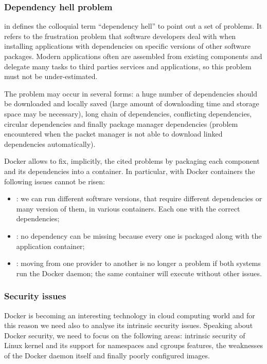 \subsubsection{Dependency hell problem}
\label{sec:background-deployments-docker-dependencyHell}
\citeauthor{michaeljang2006} in \cite{michaeljang2006} defines the colloquial term “dependency hell” 
to point out a set of problems. It refers to the frustration problem that software developers deal with
when installing applications with dependencies on specific versions of other software packages. Modern
applications often are assembled from existing components and delegate many tasks to third parties services
and applications, so this problem must not be under-estimated.

The problem may occur in several forms: a huge number of dependencies should be downloaded and locally saved
(large amount of downloading time and storage space may be necessary), long chain of dependencies, conflicting 
dependencies, circular dependencies and finally package manager dependencies (problem encountered when 
the packet manager is not able to download linked dependencies automatically).

Docker allows to fix, implicitly, the cited problems by packaging each component and its dependencies
into a container. In particular, with Docker containers the following issues cannot be risen:

\begin{itemize}
	\item{: we can run different software versions, that require
		different dependencies or many version of them, in various containers. Each one with
		the correct dependencies;}
	\item{: no dependency can be missing because every one is packaged
		along with the application container;}
	\item{: moving from one provider to another is no longer a
		problem if both systems run the Docker daemon; the same container will execute without other
		issues.}
\end{itemize}

\subsubsection{Security issues}
\label{sec:background-deployments-docker-security}
Docker is becoming an interesting technology in cloud computing world and for this reason we need also
to analyse its intrinsic security issues. Speaking about Docker security, we need to focus on the following
areas: intrinsic security of Linux kernel and its support for namespaces and cgroups features, the weaknesses
of the Docker daemon itself and finally poorly configured images.

